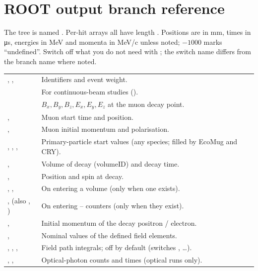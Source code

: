 \chapter{ROOT output branch reference}
\label{app:branches}
The tree is named . Per-hit arrays all have length . Positions are in mm, times in \si{\micro s}, energies in MeV and momenta in MeV/c unless noted; \(-1000\) marks ``undefined''. Switch off what you do not need with ; the switch name differs from the branch name where noted.

{\tablestyle
\begin{tabularx}{\textwidth}{@{}>{\raggedright\arraybackslash}p{} L@{}}
\toprule
{}, ,  & Identifiers and event weight.\\
 & For continuous-beam studies ().\\
 & \(B_x,B_y,B_z,E_x,E_y,E_z\) at the muon decay point.\\
,  & Muon start time and position.\\
,  & Muon initial momentum and polarisation.\\
, , ,  & Primary-particle start values (any species; filled by EcoMug and CRY).\\
,  & Volume of decay (volumeID) and decay time.\\
,  & Position and spin at decay.\\
, ,  & On entering a  volume (only when one exists).\\
,  (also , ) & On entering -- counters (only when they exist).\\
,  & Initial momentum of the decay positron / electron.\\
,  & Nominal values of the defined field elements.\\
, , ,  & Field path integrals; off by default (switches , \dots).\\
, ,  & Optical-photon counts and times (optical runs only).\\
\bottomrule
\end{tabularx}}

